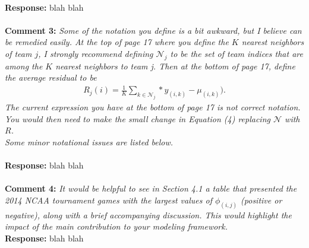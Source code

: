 \documentclass[11pt]{article} %
\begin{document}
\\
{\bf Response:} blah blah \\
\\
{\bf Comment 3:} \emph{Some of the notation you define is a bit awkward, but I believe can be remedied easily. At the top of page 17 where you define the $K$ nearest neighbors of team $j$, I strongly recommend defining $\mathcal{N}_j$ to be the set of team indices that are among the $K$ nearest neighbors to team j. Then at the bottom of page 17, define the average residual to be 
\begin{eqnarray*}
R_j(i)=\frac{1}{K} \sum_{k \in \mathcal{N}_j}*y_{(i,k)} - \mu_{(i,k)}).
\end{eqnarray*}
The current expression you have at the bottom of page 17 is not correct notation. You would then need to make the small change in Equation (4) replacing $\mathcal{N}$ with $R$.\\ 
Some minor notational issues are listed below.}\\
\\
{\bf Response:} blah blah \\
\\
{\bf Comment 4:} \emph{It would be helpful to see in Section 4.1 a table that presented the 2014 NCAA tournament games with the largest values of $\phi_{(i,j)}$ (positive or negative), along with a brief accompanying discussion. This would highlight the impact of the main contribution to your modeling framework.}
\\
{\bf Response:} blah blah \\
\end{document}
